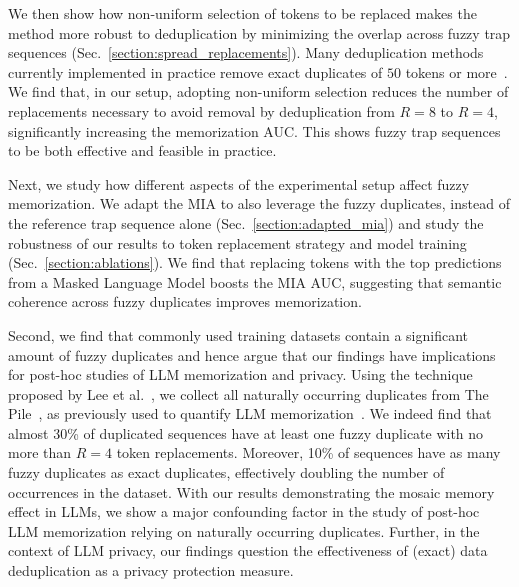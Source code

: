 We then show how non-uniform selection of tokens to be replaced makes the method more robust to deduplication by minimizing the overlap across fuzzy trap sequences (Sec.~\ref{section:spread_replacements}). Many deduplication methods currently implemented in practice remove exact duplicates of $50$ tokens or more~\cite{lee2022deduplicating,kudugunta2024madlad,penedo2023refinedweb}. We find that, in our setup, adopting non-uniform selection reduces the number of replacements necessary to avoid removal by deduplication from $R=8$ to $R=4$, significantly increasing the memorization AUC. This shows fuzzy trap sequences to be both effective and feasible in practice.

Next, we study how different aspects of the experimental setup affect fuzzy memorization. We adapt the MIA to also leverage the fuzzy duplicates, instead of the reference trap sequence alone (Sec.~\ref{section:adapted_mia}) and study the robustness of our results to token replacement strategy and model training (Sec.~\ref{section:ablations}). We find that replacing tokens with the top predictions from a Masked Language Model boosts the MIA AUC, suggesting that semantic coherence across fuzzy duplicates improves memorization.

Second, we find that commonly used training datasets contain a significant amount of fuzzy duplicates and hence argue that our findings have implications for post-hoc studies of LLM memorization and privacy. Using the technique proposed by Lee et al.~\cite{lee2022deduplicating}, we collect all naturally occurring duplicates from The Pile~\cite{pile}, as previously used to quantify LLM memorization~\cite{carlini2022quantifying, ippolito2022preventing}. We indeed find that almost 30\% of duplicated sequences have at least one fuzzy duplicate with no more than $R=4$ token replacements. Moreover, 10\% of sequences have as many fuzzy duplicates as exact duplicates, effectively doubling the number of occurrences in the dataset. With our results demonstrating the mosaic memory effect in LLMs, we show a major confounding factor in the study of post-hoc LLM memorization relying on naturally occurring duplicates. Further, in the context of LLM privacy, our findings question the effectiveness of (exact) data deduplication as a privacy protection measure.
